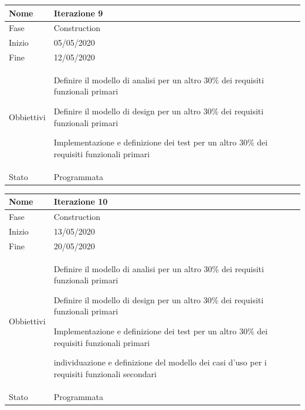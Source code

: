 \begin{center}
\begin{tabular}{ |p{2cm}|p{10cm}|  }
\hline
Nome & Iterazione 9 \\\hline
Fase & Construction \\\hline
Inizio & 05/05/2020 \\\hline
Fine &  12/05/2020  \\\hline
Obbiettivi & 
	\begin{compactitem}
		\item Definire il modello di analisi per un altro 30\% dei requisiti funzionali primari
		\item Definire il modello di design per un altro 30\% dei requisiti funzionali primari
		\item Implementazione e definizione dei test per un altro 30\% dei requisiti funzionali primari
		
	\end{compactitem}\\\hline
Stato &  Programmata \\\hline
\end{tabular}
\label{table:9}\newline


\begin{tabular}{ |p{2cm}|p{10cm}|  }
\hline
Nome & Iterazione 10 \\\hline
Fase & Construction \\\hline
Inizio & 13/05/2020 \\\hline
Fine &  20/05/2020  \\\hline
Obbiettivi & 
	\begin{compactitem}
		\item Definire il modello di analisi per un altro 30\% dei requisiti funzionali primari
		\item Definire il modello di design per un altro 30\% dei requisiti funzionali primari
		\item Implementazione e definizione dei test per un altro 30\% dei requisiti funzionali primari
		
		\item individuazione e definizione del modello dei casi d'uso per i requisiti funzionali secondari
	\end{compactitem}\\\hline
Stato &  Programmata \\\hline
\end{tabular}
\label{table:10}\newline


\end{center}
